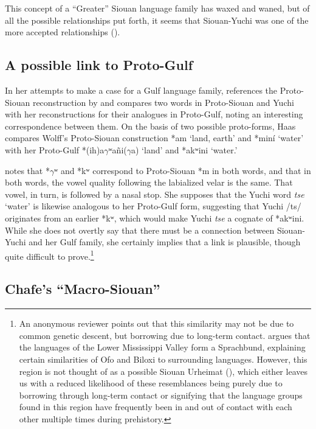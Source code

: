 \documentclass[output=paper]{LSP/langsci}
\begin{document}
This concept of a ``Greater'' Siouan language family has waxed and waned, but of all the possible relationships put forth, it seems that Siouan-Yuchi was one of the more accepted relationships (\citealt{CampbellMithun1979}).

\subsection{A possible link to Proto-Gulf}

In her attempts to make a case for a Gulf language family, \citet{Haas1951,Haas1952} references the Proto-Siouan reconstruction by \citep{Wolff1950a,Wolff1950b,Wolff1950c,Wolff1950d} and compares two words in Proto-Siouan and Yuchi with her reconstructions for their analogues in Proto-Gulf, noting an interesting correspondence between them. On the basis of two possible proto-forms, Haas compares Wolff's Proto-Siouan construction *am `land, earth' and *min\'i `water' with her Proto-Gulf *(ih)a$\gamma$ʷa\~ni($\gamma$a) `land' and *akʷini `water.' 

\citet{Haas1951,Haas1952} notes that *$\gamma$ʷ and *kʷ correspond to Proto-Siouan *m in both words, and that in both words, the vowel quality following the labialized velar is the same. That vowel, in turn, is followed by a nasal stop. She supposes that the Yuchi word \emph{tse} `water' is likewise analogous to her Proto-Gulf form, suggesting that Yuchi /ts/ originates from an earlier *kʷ, which would make Yuchi \emph{tse} a cognate of *akʷini. While she does not overtly say that there must be a connection between Siouan-Yuchi and her Gulf family, she certainly implies that a link is plausible, though quite difficult to prove.\footnote{An anonymous reviewer points out that this similarity may not be due to common genetic descent, but borrowing due to long-term contact. \citet{Kaufman2014} argues that the languages of the Lower Mississippi Valley form a Sprachbund, explaining certain similarities of Ofo and Biloxi to surrounding languages. However, this region is not thought of as a possible Siouan Urheimat (\citealt[104]{ParksRankin2001}), which either leaves us with a reduced likelihood of these resemblances being purely due to borrowing through long-term contact or signifying that the language groups found in this region have frequently been in and out of contact with each other multiple times during prehistory.}

\subsection{Chafe's ``Macro-Siouan''}
\end{document}
